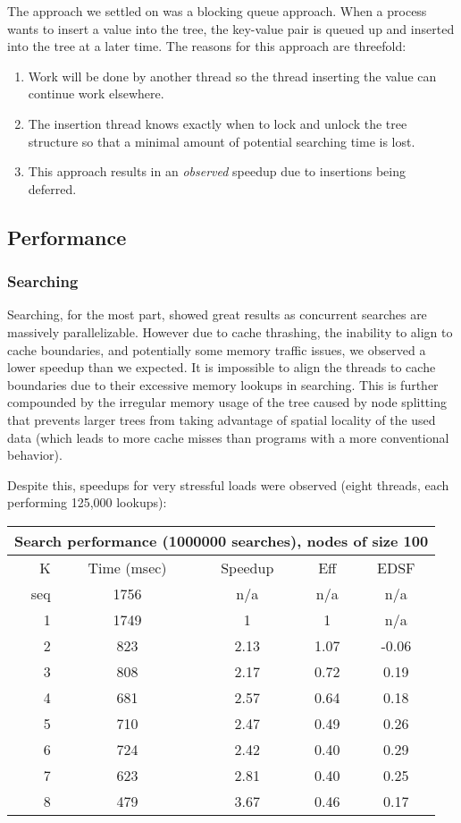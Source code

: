 \documentclass[conference]{IEEEtran}
\begin{document}
The approach we settled on was a blocking queue approach. When a process wants 
to insert a value into the tree, the key-value pair is queued up and inserted
into the tree at a later time. The reasons for this approach are threefold:
\begin{enumerate}
\item Work will be done by another thread so the thread inserting the value can
continue work elsewhere.
\item The insertion thread knows exactly when to lock and unlock the tree
structure so that a minimal amount of potential searching time is lost.
\item This approach results in an \emph{observed} speedup due to insertions being
deferred.
\end{enumerate}
\subsection{Performance}
\subsubsection{Searching}
Searching, for the most part, showed great results as concurrent searches
are massively parallelizable. However due to cache thrashing, the inability to
align to cache boundaries, and potentially some memory traffic issues, we 
observed a lower speedup than we expected. It is impossible to align the 
threads to cache boundaries due to their excessive memory lookups in searching. 
This is further compounded by the irregular memory usage of the tree caused by
node splitting that prevents larger trees from taking advantage of spatial 
locality of the used data (which leads to more cache misses than programs with
a more conventional behavior).

Despite this, speedups for very stressful loads were observed (eight threads,
each performing 125,000 lookups):
\begin{center}
\begin{tabular} { | r | c | c | c | c |}
\hline
\multicolumn{5}{|c|}{Search performance (1000000 searches), nodes of size 100}\\\hline\hline
K & Time (msec) & Speedup & Eff & EDSF \\\hline
seq & 1756 & n/a & n/a & n/a \\\hline
1 & 1749 & 1   & 1  & n/a \\\hline
2 & 823 & 2.13 & 1.07  & -0.06 \\\hline
3 & 808 & 2.17 & 0.72 & 0.19 \\\hline
4 & 681 & 2.57 & 0.64 & 0.18 \\\hline
5 & 710 & 2.47 & 0.49 & 0.26 \\\hline
6 & 724 & 2.42 & 0.40 & 0.29 \\\hline
7 & 623 & 2.81 & 0.40 & 0.25 \\\hline
8 & 479 & 3.67 & 0.46 & 0.17 \\\hline
\end{tabular}
\end{center}
\end{document}
